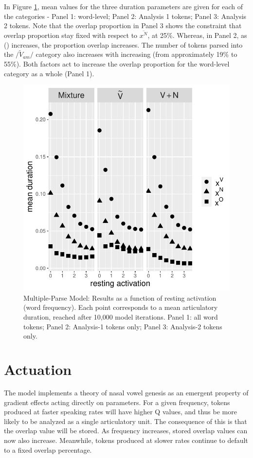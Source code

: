 In Figure \ref{fig:Multiple-Parse-Results}, mean values for the three duration parameters are given for each of
the categories - Panel 1: word-level; Panel 2: Analysis 1 tokens; Panel
3: Analysis 2 tokens. Note that the overlap proportion in Panel 3
shows the constraint that overlap proportion stay fixed with respect
to $\overline{x^{N}}$, at 25\%. Whereas, in Panel 2, as 
() increases, the proportion overlap increases. The
number of tokens parsed into the $/\tilde{V}_{am}/$ category also 
increases with increasing  (from approximately 19\%
to 55\%). Both factors act to increase the overlap proportion for the word-level category
as a whole (Panel 1). 



\begin{figure}[h]
\includegraphics[width=.70\textwidth]{figures/MultipleParseResults_Revised.pdf}
\caption{\label{fig:Multiple-Parse-Results}Multiple-Parse Model: Results as
a function of resting activation (word frequency). Each point corresponds to a mean articulatory duration, reached after 10,000 model iterations. Panel 1: all word tokens; Panel 2: Analysis-1 tokens
only; Panel 3: Analysis-2 tokens only.}
\end{figure}

\section{Actuation}

The model implements
a theory of nasal vowel genesis as an emergent property of gradient
effects acting directly on  parameters. For a given frequency, tokens produced at faster speaking rates will have higher Q values, and thus be more likely to be analyzed as a single articulatory unit. The consequence of this is that the overlap value will be stored. As frequency increases, stored overlap values can now also increase. Meanwhile, tokens produced at slower rates continue to default to a fixed overlap percentage.

